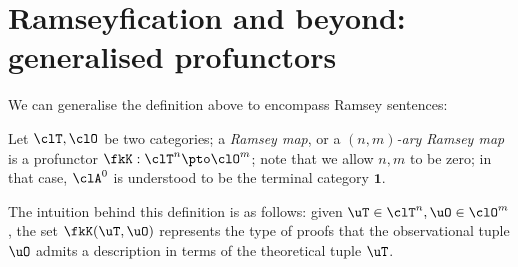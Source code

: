 \section{Ramseyfication and beyond: generalised profunctors}
\label{sec:org50db6c2}
We can generalise the definition above to encompass Ramsey sentences:
\begin{definition}\label{mn_ramsey}
	Let $\clT,\clO$ be two categories; a \emph{Ramsey map}, or a \emph{$(n,m)$-ary Ramsey map} is a profunctor $\fkK : \clT^n \pto \clO^m$; note that we allow $n,m$ to be zero; in that case, $\clA^0$ is understood to be the terminal category $\boldsymbol{1}$.
\end{definition}
The intuition behind this definition is as follows: given $\uT\in\clT^n, \uO\in\clO^m$, the set $\fkK(\uT, \uO)$ represents the type of proofs that the observational tuple $\uO$ admits a description in terms of the theoretical tuple $\uT$.


